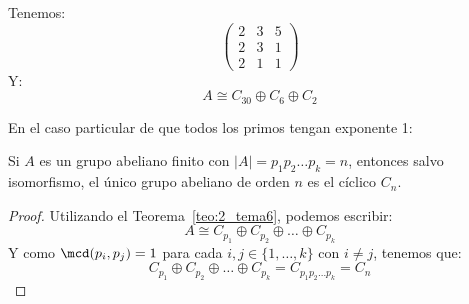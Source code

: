 \begin{ejemplo}
\begin{itemize}
\begin{equation*}
            \end{equation*}
            Tenemos:
            \begin{equation*}
                \left(\begin{array}{ccc}
                    2 & 3 & 5 \\
                    2 & 3 & 1 \\
                    2 & 1 & 1
                \end{array}\right)
            \end{equation*}
            Y:
            \begin{equation*}
                A\cong C_{30} \oplus C_6 \oplus C_2
            \end{equation*}
    \end{itemize}
\end{ejemplo}

En el caso particular de que todos los primos tengan exponente 1:

\begin{coro}
    Si $A$ es un grupo abeliano finito con $|A| = p_1p_2 \ldots p_k = n$, entonces salvo isomorfismo, el único grupo abeliano de orden $n$ es el cíclico $C_n$.
    \begin{proof}
        Utilizando el Teorema~\ref{teo:2_tema6}, podemos escribir:
        \begin{equation*}
            A \cong C_{p_1} \oplus C_{p_2} \oplus \ldots \oplus C_{p_k}
        \end{equation*}
        Y como $\mcd(p_i, p_j) = 1$ para cada $i,j\in \{1,\ldots,k\}$ con $i\neq j$, tenemos que:
        \begin{equation*}
            C_{p_1} \oplus C_{p_2} \oplus \ldots \oplus C_{p_k} = C_{p_1p_2\ldots p_k} = C_n
        \end{equation*}
    \end{proof}
\end{coro}

